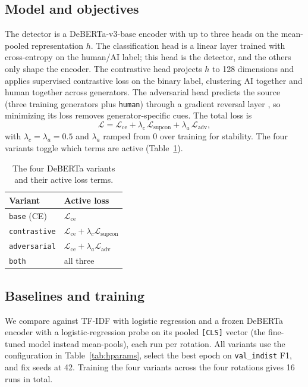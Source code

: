 \documentclass[manuscript,nonacm]{acmart}
\begin{document}
\subsection{Model and objectives}
The detector is a DeBERTa-v3-base encoder \cite{he2021deberta} with up to three
heads on the mean-pooled representation $h$. The classification head is a linear
layer trained with cross-entropy on the human/AI label; this head is the
detector, and the others only shape the encoder. The contrastive head projects
$h$ to 128 dimensions and applies supervised contrastive loss
\cite{khosla2020supcon} on the binary label, clustering AI together and human
together across generators. The adversarial head predicts the source (three
training generators plus \texttt{human}) through a gradient reversal layer
\cite{ganin2015dann}, so minimizing its loss removes generator-specific cues.
The total loss is
\begin{equation}
\mathcal{L} = \mathcal{L}_{\mathrm{ce}}
            + \lambda_c\,\mathcal{L}_{\mathrm{supcon}}
            + \lambda_a\,\mathcal{L}_{\mathrm{adv}},
\end{equation}
with $\lambda_c = \lambda_a = 0.5$ and $\lambda_a$ ramped from 0 over training
for stability. The four variants toggle which terms are active
(Table~\ref{tab:variants}).

\begin{table}[H]
\centering
\caption{The four DeBERTa variants and their active loss terms.}
\label{tab:variants}
\begin{tabular}{ll}
\toprule
Variant & Active loss \\
\midrule
\texttt{base} (CE)      & $\mathcal{L}_{\mathrm{ce}}$ \\
\texttt{contrastive}    & $\mathcal{L}_{\mathrm{ce}} + \lambda_c\mathcal{L}_{\mathrm{supcon}}$ \\
\texttt{adversarial}    & $\mathcal{L}_{\mathrm{ce}} + \lambda_a\mathcal{L}_{\mathrm{adv}}$ \\
\texttt{both}           & all three \\
\bottomrule
\end{tabular}
\end{table}

\subsection{Baselines and training}
We compare against TF-IDF with logistic regression and a frozen DeBERTa encoder
with a logistic-regression probe on its pooled \texttt{[CLS]} vector (the
fine-tuned model instead mean-pools), each run per rotation. All variants use the
configuration in Table~\ref{tab:hparams}, select the best epoch on
\texttt{val\_indist} F1, and fix seeds at 42. Training the four variants across
the four rotations gives 16 runs in total.
\end{document}
